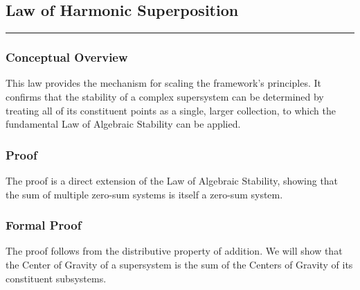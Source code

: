 \subsection*{Law of Harmonic Superposition}
\hrule
\vspace{0.3cm}
\vspace{0.5cm}

\subsubsection*{Conceptual Overview}
This law provides the mechanism for scaling the framework's principles. It confirms that the stability of a complex supersystem can be determined by treating all of its constituent points as a single, larger collection, to which the fundamental Law of Algebraic Stability can be applied.

\subsubsection*{Proof}
The proof is a direct extension of the Law of Algebraic Stability, showing that the sum of multiple zero-sum systems is itself a zero-sum system.

\subsubsection*{Formal Proof}
The proof follows from the distributive property of addition. We will show that the Center of Gravity of a supersystem is the sum of the Centers of Gravity of its constituent subsystems.

